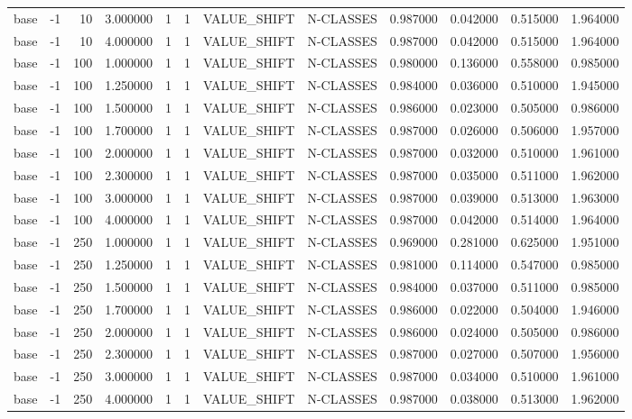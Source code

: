\begin{tabular}{lrrrllllrrrr}
base & -1 & 10 & 3.000000 & 1 & 1 & VALUE_SHIFT & N-CLASSES & 0.987000 & 0.042000 & 0.515000 & 1.964000 \\
base & -1 & 10 & 4.000000 & 1 & 1 & VALUE_SHIFT & N-CLASSES & 0.987000 & 0.042000 & 0.515000 & 1.964000 \\
base & -1 & 100 & 1.000000 & 1 & 1 & VALUE_SHIFT & N-CLASSES & 0.980000 & 0.136000 & 0.558000 & 0.985000 \\
base & -1 & 100 & 1.250000 & 1 & 1 & VALUE_SHIFT & N-CLASSES & 0.984000 & 0.036000 & 0.510000 & 1.945000 \\
base & -1 & 100 & 1.500000 & 1 & 1 & VALUE_SHIFT & N-CLASSES & 0.986000 & 0.023000 & 0.505000 & 0.986000 \\
base & -1 & 100 & 1.700000 & 1 & 1 & VALUE_SHIFT & N-CLASSES & 0.987000 & 0.026000 & 0.506000 & 1.957000 \\
base & -1 & 100 & 2.000000 & 1 & 1 & VALUE_SHIFT & N-CLASSES & 0.987000 & 0.032000 & 0.510000 & 1.961000 \\
base & -1 & 100 & 2.300000 & 1 & 1 & VALUE_SHIFT & N-CLASSES & 0.987000 & 0.035000 & 0.511000 & 1.962000 \\
base & -1 & 100 & 3.000000 & 1 & 1 & VALUE_SHIFT & N-CLASSES & 0.987000 & 0.039000 & 0.513000 & 1.963000 \\
base & -1 & 100 & 4.000000 & 1 & 1 & VALUE_SHIFT & N-CLASSES & 0.987000 & 0.042000 & 0.514000 & 1.964000 \\
base & -1 & 250 & 1.000000 & 1 & 1 & VALUE_SHIFT & N-CLASSES & 0.969000 & 0.281000 & 0.625000 & 1.951000 \\
base & -1 & 250 & 1.250000 & 1 & 1 & VALUE_SHIFT & N-CLASSES & 0.981000 & 0.114000 & 0.547000 & 0.985000 \\
base & -1 & 250 & 1.500000 & 1 & 1 & VALUE_SHIFT & N-CLASSES & 0.984000 & 0.037000 & 0.511000 & 0.985000 \\
base & -1 & 250 & 1.700000 & 1 & 1 & VALUE_SHIFT & N-CLASSES & 0.986000 & 0.022000 & 0.504000 & 1.946000 \\
base & -1 & 250 & 2.000000 & 1 & 1 & VALUE_SHIFT & N-CLASSES & 0.986000 & 0.024000 & 0.505000 & 0.986000 \\
base & -1 & 250 & 2.300000 & 1 & 1 & VALUE_SHIFT & N-CLASSES & 0.987000 & 0.027000 & 0.507000 & 1.956000 \\
base & -1 & 250 & 3.000000 & 1 & 1 & VALUE_SHIFT & N-CLASSES & 0.987000 & 0.034000 & 0.510000 & 1.961000 \\
base & -1 & 250 & 4.000000 & 1 & 1 & VALUE_SHIFT & N-CLASSES & 0.987000 & 0.038000 & 0.513000 & 1.962000 \\

\end{tabular}
